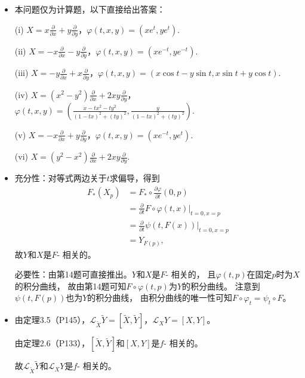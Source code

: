 \begin {itemize}
    \item[19.]
    本问题仅为计算题，以下直接给出答案：\par
	(i) $X=x\frac{\partial}{\partial x}+y\frac{\partial}{\partial y}$，$\varphi(t,x,y)=(xe^t,ye^t).$\par
	(ii) $X=-x\frac{\partial}{\partial x}-y\frac{\partial}{\partial y}$，$\varphi(t,x,y)=(xe^{-t},ye^{-t}).$\par
	(iii) $X=-y\frac{\partial}{\partial x}+x\frac{\partial}{\partial y}$，$\varphi(t,x,y)=(x\cos t-y\sin t,x\sin t+y\cos t).$\par
	(iv) $X=(x^2-y^2)\frac{\partial}{\partial x}+2xy\frac{\partial}{\partial y}$，$\varphi(t,x,y)=(\frac{x-tx^2-ty^2}{(1-tx)^2+(ty)^2},\frac{y}{(1-tx)^2+(ty)^2}).$\par
	(v) $X=-x\frac{\partial}{\partial x}+y\frac{\partial}{\partial y}$，$\varphi(t,x,y)=(xe^{-t},ye^t).$\par
	(vi) $X=(y^2-x^2)\frac{\partial}{\partial x}+2xy\frac{\partial}{\partial y}.$

    \item[20.]
    充分性：对等式两边关于$t$求偏导，得到
	\begin{align*}
		F_*(X_p)&=F_*\circ \frac{\partial \varphi}{\partial t}(0,p)\\
		&=\frac{\partial}{\partial t}F\circ\varphi(t,x)|_{t=0,x=p}\\
		&=\frac{\partial}{\partial t}\psi(t,F(x))|_{t=0,x=p}\\
		&=Y_{F(p)},
	\end{align*}
	故$Y$和$X$是$F$- 相关的。\par
	必要性：由第14题可直接推出。$Y$和$X$是$F$- 相关的，
    且$\varphi(t,p)$在固定$p$时为$X$的积分曲线，
    故由第14题可知$F\circ \varphi(t,p)$为$Y$的积分曲线。
	注意到$\psi(t,F(p))$也为$Y$的积分曲线，
    由积分曲线的唯一性可知$F\circ \varphi_t=\psi_t\circ F$。

    \item[21.]
    由定理3.5（P145），$\mathscr{L}_{\widetilde{X}}  \widetilde{Y} 
    =[\widetilde{X} ,\widetilde{Y} ]$，$\mathscr{L}_X Y=[X,Y]$。\par
	由定理2.6（P133），$[\widetilde{X} ,\widetilde{Y} ]$和$[X,Y]$是$f$- 相关的。\par
	故$\mathscr{L}_{\widetilde{X}}  \widetilde{Y}$和$\mathscr{L}_X Y$是$f$- 相关的。


\end{itemize}
